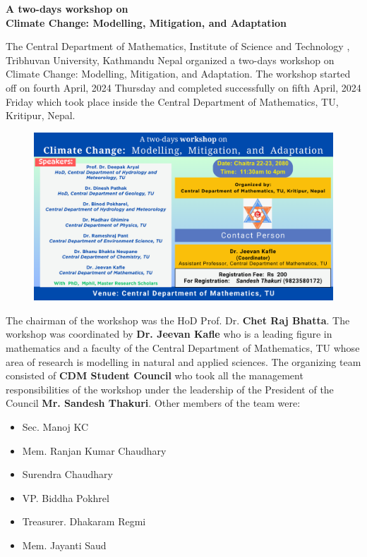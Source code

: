 \documentclass[a4paper,12pt]{report}
\begin{document}
\begin{center}
 \bfseries \Large A two-days workshop on \\
  Climate Change:  Modelling,  Mitigation,  and  Adaptation
\end{center}
\vspace{5mm}
The Central Department of Mathematics, Institute of Science and Technology , Tribhuvan University, Kathmandu Nepal organized a two-days workshop on Climate Change:  Modelling,  Mitigation, and  Adaptation. The workshop started off on fourth April, 2024 Thursday and completed successfully on fifth  April, 2024 Friday which took place inside the Central Department of Mathematics, TU, Kritipur, Nepal.
\vspace{5mm}

\begin{figure}[h!]
  \centering
  \includegraphics[scale=0.33]{workshop_climatechange.png}
\end{figure}
\vspace{5mm}
\noindent
The chairman of the workshop was the HoD Prof. Dr. \textbf{Chet Raj Bhatta}. The workshop was coordinated by \textbf{Dr. Jeevan Kafle} who is a leading figure in mathematics and a faculty of the Central Department of Mathematics, TU whose area of research is modelling in natural and applied sciences. The organizing team  consisted of \textbf{CDM Student Council} who took all the management responsibilities of the workshop under the leadership of the President of the Council \textbf{Mr. Sandesh Thakuri}. Other members of the team were:
\vspace{10mm}

\begin{minipage}{0.45\textwidth}
 \begin{itemize}
\item Sec. Manoj KC
\item Mem. Ranjan Kumar Chaudhary
\item Surendra Chaudhary
\end{itemize}
\end{minipage}\hspace{3mm}
\begin{minipage}{0.45\textwidth}
\begin{itemize}
\item VP. Biddha Pokhrel
\item Treasurer. Dhakaram Regmi
\item Mem. Jayanti Saud
\end{itemize}
\end{minipage}
\end{document}
